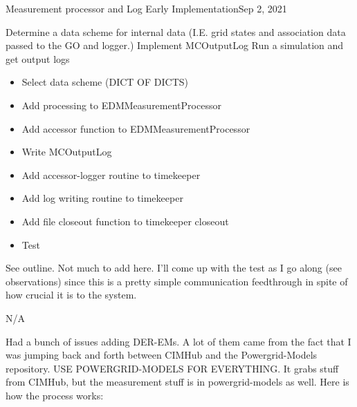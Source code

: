 \begin{entry}{Measurement processor and Log Early Implementation}{Sep 2, 2021}
    \objective 
    
    Determine a data scheme for internal data (I.E. grid states and association data passed to the GO and logger.)
    Implement MCOutputLog
    Run a simulation and get output logs

    \outline

    \begin{itemize}
        \item Select data scheme (DICT OF DICTS)
        \item Add processing to EDMMeasurementProcessor
        \item Add accessor function to EDMMeasurementProcessor
        \item Write MCOutputLog
        \item Add accessor-logger routine to timekeeper
        \item Add log writing routine to timekeeper
        \item Add file closeout function to timekeeper closeout
        \item Test

    \end{itemize}

    \procedures
    
    See outline. Not much to add here. I'll come up with the test as I go along (see observations) since this is a
    pretty simple communication feedthrough in spite of how crucial it is to the system.

    \parameters
    
    N/A

    \observations

    Had a bunch of issues adding DER-EMs. A lot of them came from the fact that I was jumping back and forth between
    CIMHub and the Powergrid-Models repository. USE POWERGRID-MODELS FOR EVERYTHING. It grabs stuff from CIMHub, but the
    measurement stuff is in powergrid-models as well. Here is how the process works:


\end{entry}
